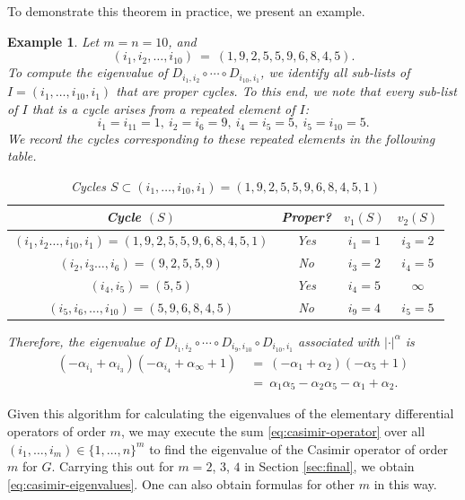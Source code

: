 \documentclass[12pt, reqno, oneside]{amsart}
\newtheorem{example}[corollary]{Example}
\numberwithin{equation}{section}
\begin{document}
To demonstrate this theorem in practice, we present an example. 

\begin{example}
Let $m=n=10$, and 
\begin{equation*}
(i_1,i_2,\dots,i_{10}) \ = \ (1,9,2,5,5,9,6,8,4,5).    
\end{equation*}
To compute the eigenvalue of $D_{i_1,i_2} \circ \cdots \circ D_{i_{10},i_1}$, we identify all sub-lists of $I = (i_1,\dots,i_{10},i_1)$ that are proper cycles. To this end, we note that every sub-list of $I$ that is a cycle arises from a repeated element of $I$:
\begin{equation*}
i_1 = i_{11} = 1, \ i_2 = i_6 = 9, \ i_4 = i_5 = 5, \ i_5 = i_{10} = 5.   
\end{equation*}
We record the cycles corresponding to these repeated elements in the following table. 
\begin{table}[hbt!]
    \centering
    \begin{tabular}{|c|c|c|c|}
    \hline
        Cycle $(S)$ & Proper? & $v_1(S)$ & $v_2(S)$ \\
        \hline
        $(i_1,i_2\dots,i_{10},i_1)=(1,9,2,5,5,9,6,8,4,5,1)$ & Yes & $i_1 = 1$ & $i_3 = 2$ \\
        $(i_2,i_3\dots,i_6) = (9,2,5,5,9)$ & No & $i_3 = 2$ & $i_4 = 5$ \\
        $(i_4,i_5)=(5,5)$ & Yes & $i_4 = 5$ & $\infty$ \\
        $(i_5,i_6,\dots,i_{10}) =  (5,9,6,8,4,5)$ & No & $i_9 = 4$ & $i_5 = 5$ \\
        \hline
    \end{tabular}
    \vspace{2mm}
    \caption{Cycles $S \subset (i_1,\dots,i_{10},i_1) = (1,9,2,5,5,9,6,8,4,5,1)$}
    \label{tab:example-cycles}
\end{table}

Therefore, the eigenvalue of $D_{i_1,i_2} \circ \cdots \circ D_{i_9,i_{10}} \circ D_{i_{10},i_1}$ associated with $|\cdot|^\alpha$ is
\begin{align*}
\left(-\alpha_{i_1}+\alpha_{i_3}\right)\left(-\alpha_{i_4}+\alpha_\infty+1\right) \ &= \ \left(-\alpha_1+\alpha_2\right)\left(-\alpha_5+1\right) \\
&= \ \alpha_1\alpha_5-\alpha_2\alpha_5-\alpha_1+\alpha_2.
\end{align*}
\end{example}

Given this algorithm for calculating the eigenvalues of the elementary differential operators of order $m$, we may execute the sum \eqref{eq:casimir-operator} over all $(i_1,\dots,i_m)\in\{1,\dots,n\}^m$ to find the eigenvalue of the Casimir operator of order $m$ for $G$. Carrying this out for $m=2$, $3$, $4$ in Section \ref{sec:final}, we obtain \eqref{eq:casimir-eigenvalues}. One can also obtain formulas for other $m$ in this way.
\end{document}

